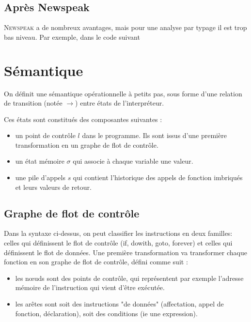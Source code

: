 \documentclass{article}
\newcommand{\newspeak}{\textsc{Newspeak}}
\begin{document}
\subsection{Après Newspeak}

\newspeak{} a de nombreux avantages, mais pour une analyse par typage il est
trop bas niveau. Par exemple, dans le code suivant



\section{Sémantique}

On définit une sémantique opérationnelle à petits pas, sous forme d'une relation
de transition (notée $→$) entre états de l'interpréteur.

Ces états sont constitués des composantes suivantes :

\begin{itemize}
\item
  un point de contrôle $l$ dans le programme. Ils sont issus d'une
  première transformation en un graphe de flot de contrôle.
\item
  un état mémoire $σ$ qui associe à chaque variable une valeur.
\item
  une pile d'appels $s$ qui contient l'historique des appels de fonction
  imbriqués et leurs valeurs de retour.
\end{itemize}

\subsection{Graphe de flot de contrôle}

Dans la syntaxe ci-dessus, on peut classifier les instructions en deux familles:
celles qui définissent le flot de contrôle (if, dowith, goto, forever) et celles
qui définissent le flot de données. Une première transformation va transformer
chaque fonction en son graphe de flot de contrôle, défini comme suit :

\begin{itemize}
\item
  les nœuds sont des points de contrôle, qui représentent par exemple
  l'adresse mémoire de l'instruction qui vient d'être exécutée.
\item
  les arêtes sont soit des instructions "de données" (affectation,
  appel de fonction, déclaration), soit des conditions (ie une
  expression).
\end{itemize}
\end{document}
